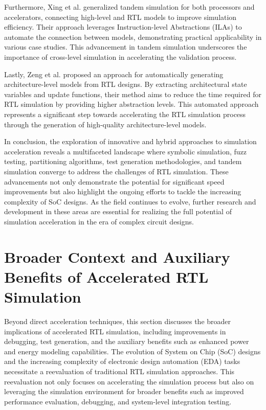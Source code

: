 \documentclass[conference]{IEEEtran}
\begin{document}
Furthermore, Xing et al. \cite{xingGeneralizingTandemSimulation2022} generalized tandem simulation for both processors and accelerators, connecting high-level and RTL models to improve simulation efficiency. Their approach leverages Instruction-level Abstractions (ILAs) to automate the connection between models, demonstrating practical applicability in various case studies. This advancement in tandem simulation underscores the importance of cross-level simulation in accelerating the validation process.

Lastly, Zeng et al. \cite{zengAutomaticGenerationArchitectureLevel2022} proposed an approach for automatically generating architecture-level models from RTL designs. By extracting architectural state variables and update functions, their method aims to reduce the time required for RTL simulation by providing higher abstraction levels. This automated approach represents a significant step towards accelerating the RTL simulation process through the generation of high-quality architecture-level models.

In conclusion, the exploration of innovative and hybrid approaches to simulation acceleration reveals a multifaceted landscape where symbolic simulation, fuzz testing, partitioning algorithms, test generation methodologies, and tandem simulation converge to address the challenges of RTL simulation. These advancements not only demonstrate the potential for significant speed improvements but also highlight the ongoing efforts to tackle the increasing complexity of SoC designs. As the field continues to evolve, further research and development in these areas are essential for realizing the full potential of simulation acceleration in the era of complex circuit designs.
\section{Broader Context and Auxiliary Benefits of Accelerated RTL Simulation}

Beyond direct acceleration techniques, this section discusses the broader implications of accelerated RTL simulation, including improvements in debugging, test generation, and the auxiliary benefits such as enhanced power and energy modeling capabilities. The evolution of System on Chip (SoC) designs and the increasing complexity of electronic design automation (EDA) tasks necessitate a reevaluation of traditional RTL simulation approaches. This reevaluation not only focuses on accelerating the simulation process but also on leveraging the simulation environment for broader benefits such as improved performance evaluation, debugging, and system-level integration testing.
\end{document}
